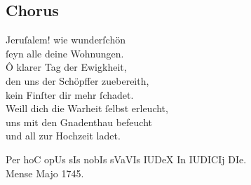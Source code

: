 \documentclass{ees}
\newenvironment{lyrics}[1]{%
  \subsection{#1}\nopagebreak%
  \begin{lyricslist}%
  \let\voice\item%
}{%
  \end{lyricslist}%
}
\begin{document}
\begin{lyrics}{Chorus}
  \voice[Chorus]
  Jeruſalem! wie wunderſchön\\
  ſeyn alle deine Wohnungen.\\
  Ô klarer Tag der Ewigkheit,\\
  den uns der Schöpffer zuebereith,\\
  kein Finſter dir mehr ſchadet.\\[1ex]
  Weill dich die Warheit ſelbst erleucht,\\
  uns mit den Gnadenthau befeucht\\
  und all zur Hochzeit ladet.
\end{lyrics}

Per hoC opUs sIs nobIs sVaVIs IUDeX In IUDICIj DIe.\\
Mense Majo 1745.
\end{document}
